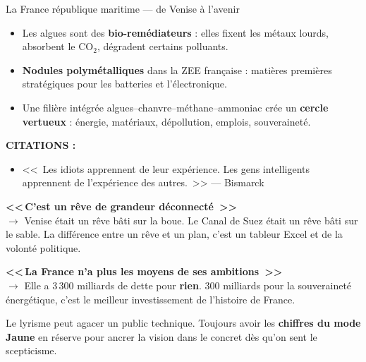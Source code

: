 \documentclass[a4paper,11pt]{article}
\begin{document}
\begin{fichevert}{La France r\'{e}publique maritime --- de Venise \`{a} l'avenir}
\begin{center}
\end{center}

\begin{itemize}[nosep, label=\color{ModeVert}]
  \item Les algues sont des \textbf{bio-rem\'{e}diateurs} : elles fixent les m\'{e}taux lourds, absorbent le CO$_2$, d\'{e}gradent certains polluants.
  \item \textbf{Nodules polym\'{e}talliques} dans la ZEE fran\c{c}aise : mati\`{e}res premi\`{e}res strat\'{e}giques pour les batteries et l'\'{e}lectronique.
  \item Une fili\`{e}re int\'{e}gr\'{e}e algues--chanvre--m\'{e}thane--ammoniac cr\'{e}e un \textbf{cercle vertueux} : \'{e}nergie, mat\'{e}riaux, d\'{e}pollution, emplois, souverainet\'{e}.
\end{itemize}

\vspace{0.3cm}
\textbf{CITATIONS :}
\begin{itemize}[nosep, font=\itshape]
  \item <<~Les idiots apprennent de leur exp\'{e}rience. Les gens intelligents apprennent de l'exp\'{e}rience des autres.~>> --- Bismarck
\end{itemize}

\begin{contrearg}
\textbf{<<\,C'est un r\^{e}ve de grandeur d\'{e}connect\'{e}~>>}\\
$\rightarrow$ Venise \'{e}tait un r\^{e}ve b\^{a}ti sur la boue. Le Canal de Suez \'{e}tait un r\^{e}ve b\^{a}ti sur le sable. La diff\'{e}rence entre un r\^{e}ve et un plan, c'est un tableur Excel et de la volont\'{e} politique.

\textbf{<<\,La France n'a plus les moyens de ses ambitions~>>}\\
$\rightarrow$ Elle a 3\,300 milliards de dette pour \textbf{rien}. 300 milliards pour la souverainet\'{e} \'{e}nerg\'{e}tique, c'est le meilleur investissement de l'histoire de France.
\end{contrearg}

\begin{anglemort}
Le lyrisme peut agacer un public technique. Toujours avoir les \textbf{chiffres du mode Jaune} en r\'{e}serve pour ancrer la vision dans le concret d\`{e}s qu'on sent le scepticisme.
\end{anglemort}


\end{fichevert}
\end{document}
